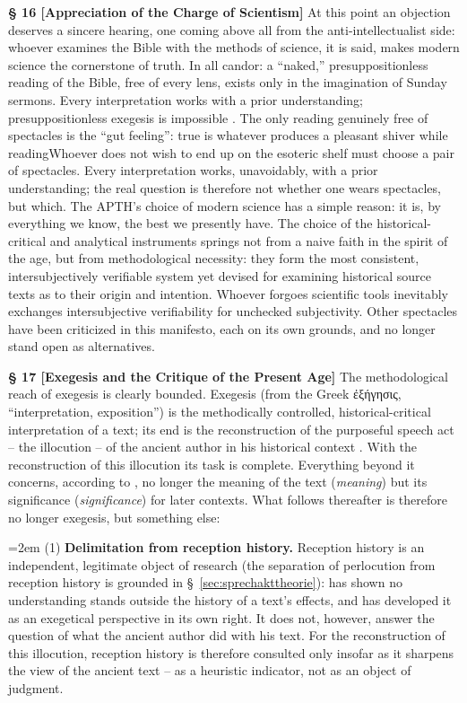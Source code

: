 \documentclass[11pt,a4paper]{article}
\makeatletter
\newcommand{\apth}{{\apthfont APTH}\hspace{0.15em}\xspace}
\newcommand{\subpar}[1]{%
  \begingroup
  \leftskip=2em %
  \noindent#1\par
  \endgroup
}
\newcommand{\apthsec}[3]{%
  \phantomsection%
  \def\@currentlabel{#1}%
  \label{sec:#3}%
  \textbf{§ #1 [#2]}%
}
\makeatother
\begin{document}
\apthsec{16}{Appreciation of the Charge of Scientism}{wissenschaftsglaeubigkeit} At this point an objection deserves a sincere hearing, one coming above all from the anti-intellectualist side: whoever examines the Bible with the methods of science, it is said, makes modern science the cornerstone of truth. In all candor: a ``naked,'' presuppositionless reading of the Bible, free of every lens, exists only in the imagination of Sunday sermons. Every interpretation works with a prior understanding; presuppositionless exegesis is impossible \citep{bultmann1957,gadamer1960}. The only reading genuinely free of spectacles is the ``gut feeling'': true is whatever produces a pleasant shiver while reading\textinterrobang\space Whoever does not wish to end up on the esoteric shelf must choose a pair of spectacles. Every interpretation works, unavoidably, with a prior understanding; the real question is therefore not whether one wears spectacles, but which. The \apth's choice of modern science has a simple reason: it is, by everything we know, the best we presently have. The choice of the historical-critical and analytical instruments springs not from a naive faith in the spirit of the age, but from methodological necessity: they form the most consistent, intersubjectively verifiable system yet devised for examining historical source texts as to their origin and intention. Whoever forgoes scientific tools inevitably exchanges intersubjective verifiability for unchecked subjectivity. Other spectacles have been criticized in this manifesto, each on its own grounds, and no longer stand open as alternatives.

\apthsec{17}{Exegesis and the Critique of the Present Age}{exegese-zeitkritik} The methodological reach of exegesis is clearly bounded. Exegesis (from the Greek ἐξήγησις, ``interpretation, exposition'') is the methodically controlled, historical-critical interpretation of a text; its end is the reconstruction of the purposeful speech act -- the illocution -- of the ancient author in his historical context \citep{stuhlmacher1989}. With the reconstruction of this illocution its task is complete. Everything beyond it concerns, according to \citet{hirsch1967}, no longer the meaning of the text (\textit{meaning}) but its significance (\textit{significance}) for later contexts. What follows thereafter is therefore no longer exegesis, but something else:

\subpar{(1) \textbf{Delimitation from reception history.} Reception history is an independent, legitimate object of research (the separation of perlocution from reception history is grounded in §~\ref{sec:sprechakttheorie}): \citet{gadamer1960} has shown no understanding stands outside the history of a text's effects, and \citet{luz1985} has developed it as an exegetical perspective in its own right. It does not, however, answer the question of what the ancient author did with his text. For the reconstruction of this illocution, reception history is therefore consulted only insofar as it sharpens the view of the ancient text -- as a heuristic indicator, not as an object of judgment.}
\end{document}
